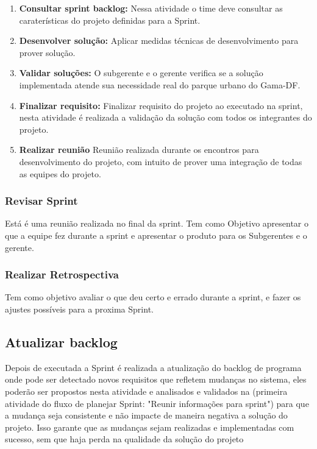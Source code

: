 \begin{enumerate}
	\item \textbf{Consultar sprint backlog:}
	Nessa atividade o time deve consultar as caraterísticas do projeto definidas para a Sprint.
	\item \textbf{Desenvolver solução:}
	Aplicar medidas técnicas de desenvolvimento para prover solução.
	\item \textbf{Validar soluções:}
	O subgerente e o gerente verifica se a solução implementada atende sua necessidade real do parque urbano do Gama-DF. 
	\item \textbf{Finalizar requisito:}
	Finalizar requisito do projeto ao executado na sprint, nesta atividade é realizada a validação da solução com todos os integrantes do projeto. 
	\item \textbf{Realizar reunião}
	Reunião realizada durante os encontros para desenvolvimento do projeto, com intuito de prover uma integração de todas as equipes do projeto. 
\end{enumerate}

\subsubsection{Revisar Sprint}

Está é uma reunião realizada no final da sprint. Tem como Objetivo apresentar o que  a equipe fez durante a sprint e apresentar o produto para os Subgerentes e o gerente. 

\subsubsection{Realizar Retrospectiva}
Tem como objetivo avaliar o que deu certo e errado durante a sprint, e fazer os ajustes possíveis  para a proxima Sprint.

\subsection{Atualizar backlog}
Depois de executada a Sprint é realizada a atualização do backlog de programa onde pode ser detectado novos requisitos que refletem mudanças no sistema, eles poderão ser propostos nesta atividade e analisados e validados na (primeira atividade do fluxo de planejar Sprint: "Reunir informações para sprint") para que a mudança seja consistente e não impacte de maneira negativa a solução do projeto. Isso garante que as mudanças sejam realizadas e implementadas com sucesso, sem que haja perda na qualidade da solução do projeto

